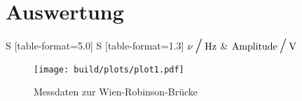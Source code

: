 \newpage 
\section{Auswertung}

        \begin{table}[ht]
          \centering
          \small
          \caption{Messdaten zur Wien-Robinson-Brücke}
          \label{tab:tab2}
          \begin{tabular}{S [table-format=5.0] S [table-format=1.3]}
           \toprule
           {$\nu \mathbin{\scalebox{1.5} / } \si{\hertz}$} & $\text{Amplitude} \mathbin{\scalebox{1.5} / } \si{\volt}$\\
           \midrule
          \end{tabular}
        \end{table} 


        \begin{figure}
            \centering
            \texttt{[image: build/plots/plot1.pdf]}
            \caption{Messdaten zur Wien-Robinson-Brücke}
          \label{fig:plot1}
        \end{figure}
